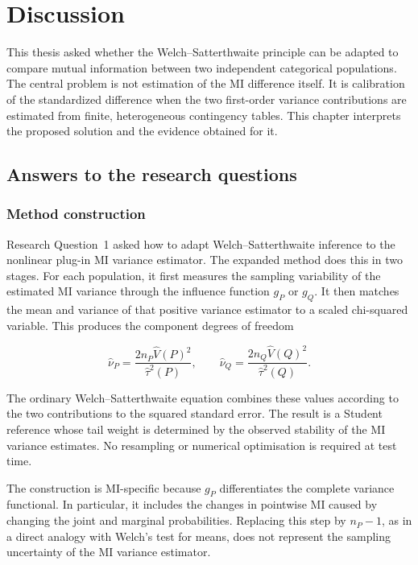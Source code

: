 \chapter{Discussion}
\label{chap:discussion}

This thesis asked whether the Welch--Satterthwaite principle can be adapted
to compare mutual information between two independent categorical
populations. The central problem is not estimation of the MI difference
itself. It is calibration of the standardized difference when the two
first-order variance contributions are estimated from finite, heterogeneous
contingency tables. This chapter interprets the proposed solution and the
evidence obtained for it.

\section{Answers to the research questions}

\subsection{Method construction}

Research Question~1 asked how to adapt Welch--Satterthwaite inference to the
nonlinear plug-in MI variance estimator. The expanded method does this in two
stages. For each population, it first measures the sampling variability of
the estimated MI variance through the influence function $g_P$ or $g_Q$.
It then matches the mean and variance of that positive variance estimator to
a scaled chi-squared variable. This produces the component degrees of freedom

\begin{equation}
  \widehat\nu_P
  =\frac{2n_P\widehat V(P)^2}{\widehat\tau^2(P)},
  \qquad
  \widehat\nu_Q
  =\frac{2n_Q\widehat V(Q)^2}{\widehat\tau^2(Q)}.
  \label{eq:discussion-component-df}
\end{equation}

The ordinary Welch--Satterthwaite equation combines these values according to
the two contributions to the squared standard error. The result is a Student
reference whose tail weight is determined by the observed stability of the
MI variance estimates. No resampling or numerical optimisation is required at
test time.

The construction is MI-specific because $g_P$ differentiates the complete
variance functional. In particular, it includes the changes in pointwise MI
caused by changing the joint and marginal probabilities. Replacing this step
by $n_P-1$, as in a direct analogy with Welch's test for means, does not
represent the sampling uncertainty of the MI variance estimator.

